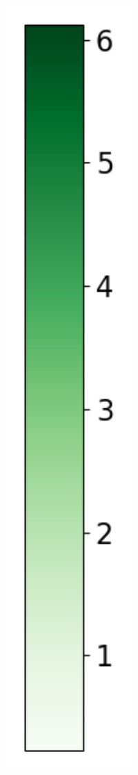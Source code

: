 \begin{figure}
\begin{subfigure}[b]{0.075\textwidth}
        \includegraphics[width=1\textwidth]{Results/kd-laplace/kd-Laplace/line-dataset/heatmap_legend_distance.png}
    \end{subfigure}
\end{figure}
\newpage
